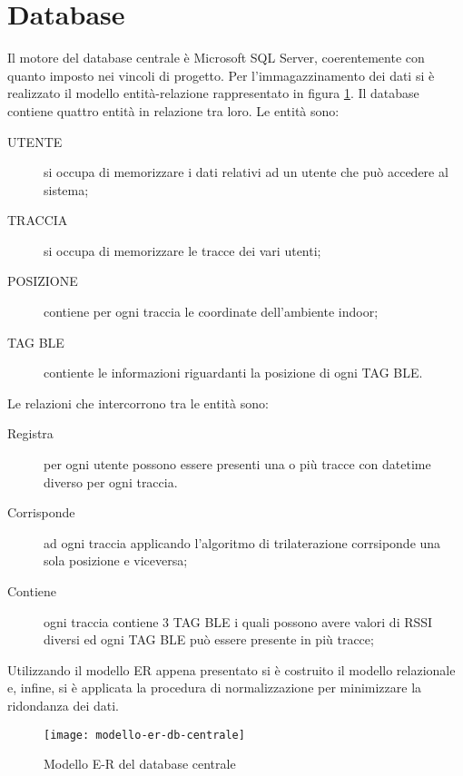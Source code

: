 \section{Database}
Il motore del database centrale è Microsoft SQL Server, coerentemente con quanto imposto nei vincoli di progetto. Per l’immagazzinamento dei dati si è realizzato il modello entità-relazione rappresentato in figura \ref{fig:modello-er-db-centrale}. Il database contiene quattro entità in relazione tra loro. Le entità sono:
\begin{description}
	
	\item[UTENTE] si occupa di memorizzare i dati relativi ad un utente che può accedere al sistema;
	
	\item[TRACCIA] si occupa di memorizzare le tracce dei vari utenti;
	
	\item[POSIZIONE] contiene per ogni traccia le coordinate dell'ambiente indoor;
	
	\item[TAG BLE] contiente le informazioni riguardanti la posizione di ogni TAG BLE.
	
\end{description}
Le relazioni che intercorrono tra le entità sono:
\begin{description}
	
	\item[Registra] per ogni utente possono essere presenti una o più tracce con datetime diverso per ogni traccia.
	
	\item[Corrisponde] ad ogni traccia applicando l'algoritmo di trilaterazione corrsiponde una sola posizione e viceversa;
	
	\item[Contiene] ogni traccia contiene 3 TAG BLE i quali possono avere valori di RSSI diversi ed ogni TAG BLE può essere presente in più tracce;
	
\end{description}
Utilizzando il modello ER appena presentato si è costruito il modello relazionale e, infine, si è applicata la procedura di normalizzazione per minimizzare la ridondanza dei dati.

\begin{figure}[htp]
	\centering
	\texttt{[image: modello-er-db-centrale]}
	\caption{Modello E-R del database centrale}
	\label{fig:modello-er-db-centrale}
\end{figure}


